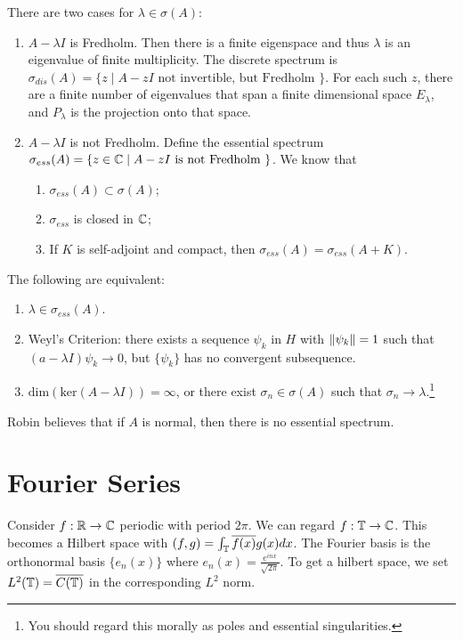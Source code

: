 \documentclass[10pt, twoside]{article}
\begin{document}
    There are two cases for $\lambda \in \sigma(A)$:
    \begin{enumerate}
        \item $A-\lambda I$ is Fredholm. Then there is a finite eigenspace and thus $\lambda$ is an eigenvalue of finite multiplicity. The discrete spectrum is $\sigma_{dis}(A) = \{z \mid A-zI \text{ not invertible, but Fredholm } \}.$ For each such $z$, there are a finite number of eigenvalues that span a finite dimensional space $E_{\lambda}$, and $P_{\lambda}$ is the projection onto that space.
        \item $A-\lambda I$ is not Fredholm. Define the essential spectrum $\sigma_{ess}(A) = \{z \in \mathbb{C} \mid A-zI \text{ is not Fredholm } \}$. We know that
            \begin{enumerate}
                \item $\sigma_{ess}(A) \subset \sigma(A)$;
                \item $\sigma_{ess}$ is closed in $\mathbb{C}$;
                \item If $K$ is self-adjoint and compact, then $\sigma_{ess}(A) = \sigma_{ess}(A+K)$.
            \end{enumerate}
    \end{enumerate}

    \begin{thm}
        The following are equivalent:
        \begin{enumerate}
            \item $\lambda \in \sigma_{ess}(A)$.
            \item Weyl's Criterion: there exists a sequence $\psi_k$ in $H$ with $\lVert\psi_k\rVert = 1$ such that $(a-\lambda I) \psi_k \to 0$, but $\{\psi_k\}$ has no convergent subsequence.
            \item $\mathrm{dim}(\mathrm{ker}(A-\lambda I)) = \infty$, or there exist $\sigma_n \in \sigma(A)$ such that $\sigma_n \to \lambda$.\footnote{You should regard this morally as poles and essential singularities.}
        \end{enumerate}
    \end{thm}

    \begin{rmk}
        Robin believes that if $A$ is normal, then there is no essential spectrum.
    \end{rmk}

    \section{Fourier Series}
    Consider $f:\mathbb{R} \to \mathbb{C}$ periodic with period $2 \pi$. We can regard $f: \mathbb{T} \to \mathbb{C}$. This becomes a Hilbert space with $(f,g) = \int_{\mathbb{T}} \overline{f(x)}g(x) dx$. The Fourier basis is the orthonormal basis $\{e_n(x)\}$ where $e_n(x) = \frac{e^{inx}}{\sqrt{2 \pi}}$. To get a hilbert space, we set $L^2(\mathbb{T}) = \overline{C(\mathbb{T})}$ in the corresponding $L^2$ norm.
\end{document}
